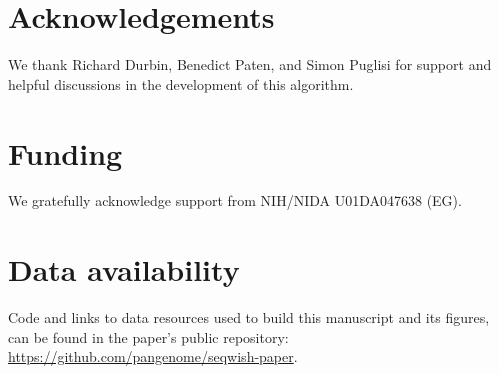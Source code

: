 \documentclass{bioinfo}
\theoremstyle{definition}
\begin{document}
    \section*{Acknowledgements}

    We thank Richard Durbin, Benedict Paten, and Simon Puglisi for support and helpful discussions in the development of this algorithm.

    \section*{Funding}

    We gratefully acknowledge support from NIH/NIDA U01DA047638 (EG).

    \section*{Data availability}

    Code and links to data resources used to build this manuscript and its figures, can be found in the paper's public repository: \url{https://github.com/pangenome/seqwish-paper}.

    

    
\end{document}
